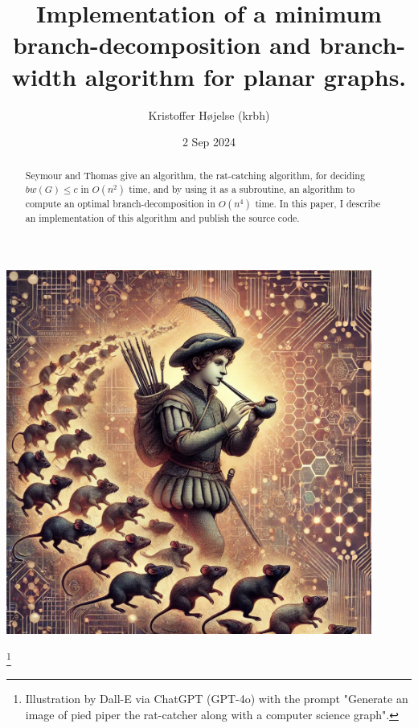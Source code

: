 \documentclass{article}
\title{Implementation of a minimum branch-decomposition and branch-width algorithm for planar graphs.}
\author{Kristoffer Højelse (krbh)}
\date{2 Sep 2024}
\begin{document}
\maketitle

\begin{center}
	\includegraphics[width=0.9\textwidth]{images/dalle-pied-piper.png}
\end{center}
\footnote{Illustration by Dall-E via ChatGPT (GPT-4o) with the prompt "Generate an image of pied piper the rat-catcher along with a computer science graph".}

\newpage



\begin{abstract}
	Seymour and Thomas give an algorithm, the rat-catching algorithm, for deciding $bw(G) \leq c$ in $O(n^2)$ time, and by using it as a subroutine, an algorithm to compute an optimal branch-decomposition in $O(n^4)$ time. In this paper, I describe an implementation of this algorithm and publish the source code.
\end{abstract}
\end{document}
